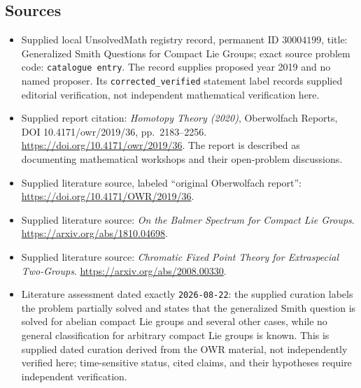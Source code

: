 \documentclass[11pt]{article}
\begin{document}
\subsection{Sources}
\begin{itemize}
\item Supplied local UnsolvedMath registry record, permanent ID \(30004199\), title: Generalized Smith Questions for Compact Lie Groups; exact source problem code: \texttt{catalogue entry}. The record supplies proposed year 2019 and no named proposer. Its \texttt{corrected\_verified} statement label records supplied editorial verification, not independent mathematical verification here.
\item Supplied report citation: \emph{Homotopy Theory (2020)}, Oberwolfach Reports, DOI 10.4171/owr/2019/36, pp.\ 2183--2256. \url{https://doi.org/10.4171/owr/2019/36}. The report is described as documenting mathematical workshops and their open-problem discussions.
\item Supplied literature source, labeled ``original Oberwolfach report'': \url{https://doi.org/10.4171/OWR/2019/36}.
\item Supplied literature source: \emph{On the Balmer Spectrum for Compact Lie Groups}. \url{https://arxiv.org/abs/1810.04698}.
\item Supplied literature source: \emph{Chromatic Fixed Point Theory for Extraspecial Two-Groups}. \url{https://arxiv.org/abs/2008.00330}.
\item Literature assessment dated exactly \texttt{2026-08-22}: the supplied curation labels the problem partially solved and states that the generalized Smith question is solved for abelian compact Lie groups and several other cases, while no general classification for arbitrary compact Lie groups is known. This is supplied dated curation derived from the OWR material, not independently verified here; time-sensitive status, cited claims, and their hypotheses require independent verification.
\end{itemize}
\end{document}
